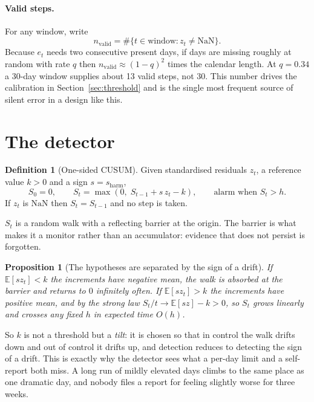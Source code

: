 \documentclass{article}
\theoremstyle{plain}
\newtheorem{proposition}[theorem]{Proposition}
\theoremstyle{definition}
\newtheorem{definition}{Definition}[section]
\theoremstyle{remark}
\numberwithin{equation}{section}
\begin{document}
\paragraph{Valid steps.} For any window, write
\[
  n_{\mathrm{valid}} = \#\{t \in \text{window} : z_t \ne \mathrm{NaN}\}.
\]
Because $e_t$ needs two consecutive present days, if days are missing roughly
at random with rate $q$ then $n_{\mathrm{valid}} \approx (1-q)^2$ times the
calendar length. At $q = 0.34$ a 30-day window supplies about 13 valid steps,
not 30. This number drives the calibration in Section~\ref{sec:threshold} and
is the single most frequent source of silent error in a design like this.

\section{The detector}
\label{sec:detector}

\begin{definition}[One-sided CUSUM]
\label{def:cusum}
Given standardised residuals $z_t$, a reference value $k>0$ and a sign
$s = s_{\mathrm{harm}}$,
\[
  S_0 = 0,
  \qquad
  S_t = \max\!\left(0,\; S_{t-1} + s\,z_t - k\right),
  \qquad \text{alarm when } S_t > h .
\]
If $z_t$ is $\mathrm{NaN}$ then $S_t = S_{t-1}$ and no step is taken.
\end{definition}

$S_t$ is a random walk with a reflecting barrier at the origin. The barrier is
what makes it a monitor rather than an accumulator: evidence that does not
persist is forgotten.

\begin{proposition}[The hypotheses are separated by the sign of a drift]
\label{prop:drift}
If $\mathbb{E}[s z_t] < k$ the increments have negative mean, the walk is
absorbed at the barrier and returns to $0$ infinitely often. If
$\mathbb{E}[s z_t] > k$ the increments have positive mean, and by the strong
law $S_t / t \to \mathbb{E}[s z]-k > 0$, so $S_t$ grows linearly and crosses
any fixed $h$ in expected time $O(h)$.
\end{proposition}

So $k$ is not a threshold but a \emph{tilt}: it is chosen so that in control
the walk drifts down and out of control it drifts up, and detection reduces to
detecting the sign of a drift. This is exactly why the detector sees what a
per-day limit and a self-report both miss. A long run of mildly elevated days
climbs to the same place as one dramatic day, and nobody files a report for
feeling slightly worse for three weeks.
\end{document}

